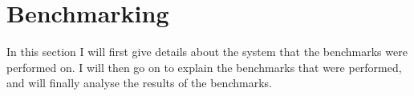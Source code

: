 \section{Benchmarking}
In this section I will first give details about the system that the benchmarks were performed on.
I will then go on to explain the benchmarks that were performed, and will finally analyse the results of the benchmarks.







